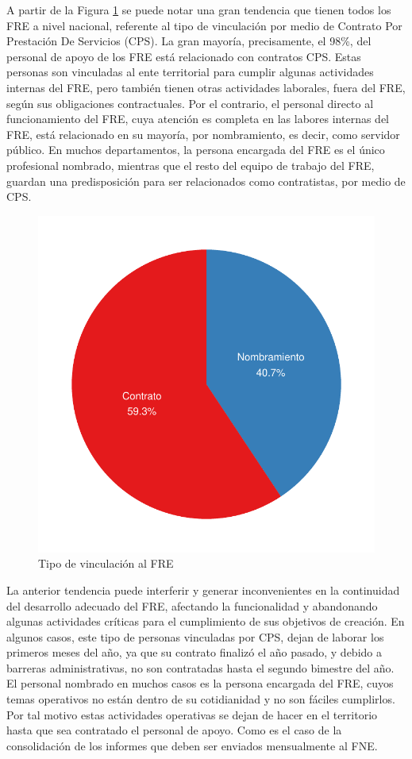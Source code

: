 \documentclass[
]{book}
\begin{document}
A partir de la Figura \ref{fig:pieProfesional2} se puede notar una gran tendencia que tienen todos los FRE a nivel nacional, referente al tipo de vinculación por medio de Contrato Por Prestación De Servicios (CPS). La gran mayoría, precisamente, el 98\%, del personal de apoyo de los FRE está relacionado con contratos CPS. Estas personas son vinculadas al ente territorial para cumplir algunas actividades internas del FRE, pero también tienen otras actividades laborales, fuera del FRE, según sus obligaciones contractuales. Por el contrario, el personal directo al funcionamiento del FRE, cuya atención es completa en las labores internas del FRE, está relacionado en su mayoría, por nombramiento, es decir, como servidor público. En muchos departamentos, la persona encargada del FRE es el único profesional nombrado, mientras que el resto del equipo de trabajo del FRE, guardan una predisposición para ser relacionados como contratistas, por medio de CPS.

\begin{figure}

{\centering \includegraphics[width=0.85\linewidth]{InformeFinal_files/figure-latex/pieProfesional2-1} 

}

\caption{Tipo de vinculación al FRE}\label{fig:pieProfesional2}
\end{figure}

La anterior tendencia puede interferir y generar inconvenientes en la continuidad del desarrollo adecuado del FRE, afectando la funcionalidad y abandonando algunas actividades críticas para el cumplimiento de sus objetivos de creación. En algunos casos, este tipo de personas vinculadas por CPS, dejan de laborar los primeros meses del año, ya que su contrato finalizó el año pasado, y debido a barreras administrativas, no son contratadas hasta el segundo bimestre del año. El personal nombrado en muchos casos es la persona encargada del FRE, cuyos temas operativos no están dentro de su cotidianidad y no son fáciles cumplirlos. Por tal motivo estas actividades operativas se dejan de hacer en el territorio hasta que sea contratado el personal de apoyo. Como es el caso de la consolidación de los informes que deben ser enviados mensualmente al FNE.
\end{document}
